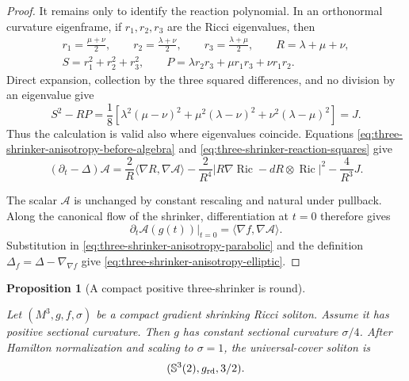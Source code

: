 \documentclass[10pt]{coll-l}
\newcommand{\Sph}{\mathbb{S}}
\newtheorem{proposition}[theorem]{Proposition}
\theoremstyle{definition}
\theoremstyle{remark}
\numberwithin{section}{chapter}
\numberwithin{equation}{chapter}
\newcommand{\Ric}{\operatorname{Ric}}
\begin{document}
\begin{proof}
It remains only to identify the reaction polynomial.  In an orthonormal
curvature eigenframe, if $r_1,r_2,r_3$ are the Ricci eigenvalues, then
\begin{equation}
 \begin{gathered}
 r_1=\frac{\mu+\nu}{2},\qquad
 r_2=\frac{\lambda+\nu}{2},\qquad
 r_3=\frac{\lambda+\mu}{2},\qquad
 R=\lambda+\mu+\nu,\\
 S=r_1^2+r_2^2+r_3^2,\qquad
 P=\lambda r_2r_3+\mu r_1r_3+\nu r_1r_2.
 \end{gathered}                                          \label{eq:three-shrinker-reaction-eigenframe}
\end{equation}
Direct expansion, collection by the three squared differences, and no
division by an eigenvalue give
\begin{equation}
 S^2-RP
  =\frac18\left[
       \lambda^2(\mu-\nu)^2
      +\mu^2(\lambda-\nu)^2
      +\nu^2(\lambda-\mu)^2
    \right]=J.                                          \label{eq:three-shrinker-reaction-squares}
\end{equation}
Thus the calculation is valid also where eigenvalues coincide.  Equations
\eqref{eq:three-shrinker-anisotropy-before-algebra} and
\eqref{eq:three-shrinker-reaction-squares} give
\begin{equation}
 (\partial_t-\Delta)\mathcal A
  =\frac2R\langle\nabla R,\nabla\mathcal A\rangle
   -\frac2{R^4}|R\nabla\Ric-dR\otimes\Ric|^2
   -\frac4{R^3}J.                                        \label{eq:three-shrinker-anisotropy-parabolic}
\end{equation}

The scalar $\mathcal A$ is unchanged by constant rescaling and natural
under pullback.  Along the canonical flow of the shrinker, differentiation
at $t=0$ therefore gives
\[
                  \left.\partial_t\mathcal A(g(t))\right|_{t=0}
                     =\langle\nabla f,\nabla\mathcal A\rangle.
\]
Substitution in
\eqref{eq:three-shrinker-anisotropy-parabolic} and the definition
$\Delta_f=\Delta-\nabla_{\nabla f}$ give
\eqref{eq:three-shrinker-anisotropy-elliptic}.
\end{proof}

\begin{proposition}[A compact positive three-shrinker is round]
\label{prop:compact-positive-three-shrinker-round}
\leavevmode\par\noindent
Let $(M^3,g,f,\sigma)$ be a compact gradient shrinking Ricci soliton.
Assume it has positive sectional curvature.  Then $g$ has constant sectional curvature
$\sigma/4$.  After Hamilton normalization and scaling to $\sigma=1$, the
universal-cover soliton is
\begin{equation}
                         (\Sph^3(2),g_{\rm rd},3/2).      \label{eq:positive-three-shrinker-sphere-cover}
\end{equation}
\end{proposition}
\end{document}
